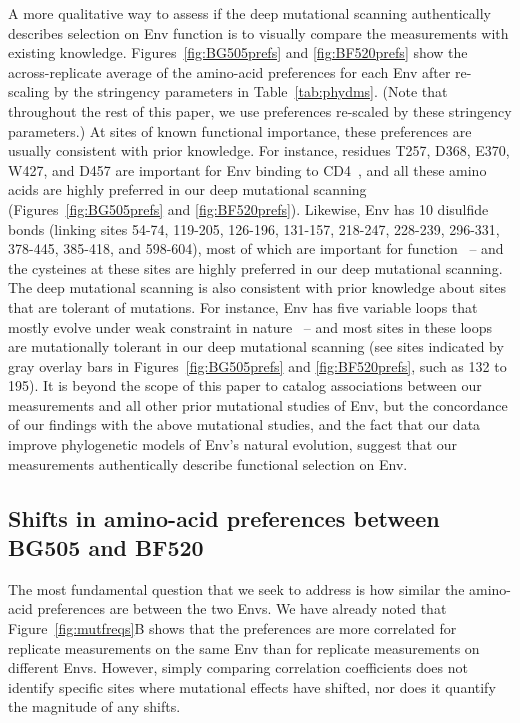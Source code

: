 \documentclass[9pt]{elife}
\begin{document}
A more qualitative way to assess if the deep mutational scanning authentically describes selection on Env function is to visually compare the measurements with existing knowledge.
Figures~\ref{fig:BG505prefs} and \ref{fig:BF520prefs} show the across-replicate average of the amino-acid preferences for each Env after re-scaling by the stringency parameters in Table~\ref{tab:phydms}.
(Note that throughout the rest of this paper, we use preferences re-scaled by these stringency parameters.)
At sites of known functional importance, these preferences are usually consistent with prior knowledge.
For instance, residues T257, D368, E370, W427, and D457 are important for Env binding to CD4~\citep{olshevsky1990identification}, and all these amino acids are highly preferred in our deep mutational scanning (Figures~\ref{fig:BG505prefs} and \ref{fig:BF520prefs}).
Likewise, Env has 10 disulfide bonds (linking sites 54-74, 119-205, 126-196, 131-157, 218-247, 228-239, 296-331, 378-445, 385-418, and 598-604), most of which are important for function~\citep{van2008only} -- and the cysteines at these sites are highly preferred in our deep mutational scanning.
The deep mutational scanning is also consistent with prior knowledge about sites that are tolerant of mutations.
For instance, Env has five variable loops that mostly evolve under weak constraint in nature~\citep{starcich1986identification,zolla2010structure} -- and most sites in these loops are mutationally tolerant in our deep mutational scanning (see sites indicated by gray overlay bars in Figures~\ref{fig:BG505prefs} and \ref{fig:BF520prefs}, such as 132 to 195).
It is beyond the scope of this paper to catalog associations between our measurements and all other prior mutational studies of Env, but the concordance of our findings with the above mutational studies, and the fact that our data improve phylogenetic models of Env's natural evolution, suggest that our measurements authentically describe functional selection on Env.

\subsection{Shifts in amino-acid preferences between BG505 and BF520}
The most fundamental question that we seek to address is how similar the amino-acid preferences are between the two Envs.
We have already noted that Figure~\ref{fig:mutfreqs}B shows that the preferences are more correlated for replicate measurements on the same Env than for replicate measurements on different Envs.
However, simply comparing correlation coefficients does not identify specific sites where mutational effects have shifted, nor does it quantify the magnitude of any shifts.
\end{document}

